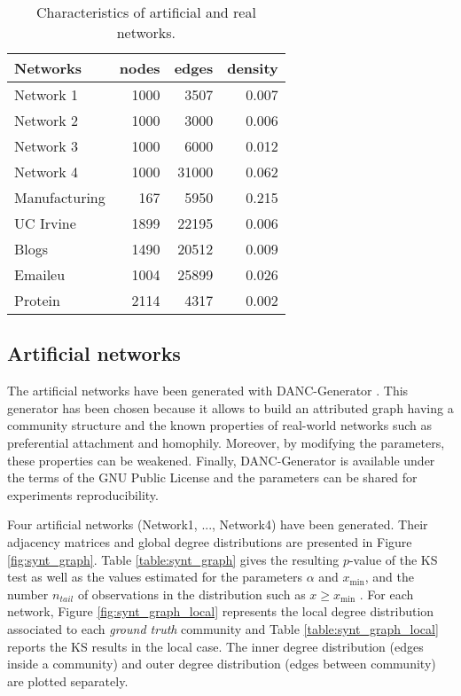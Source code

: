 \documentclass[a4paper, 12pt]{article}
\begin{document}
\begin{table}[h] 
	\centering
	\caption{Characteristics of artificial and real networks.}
    \begin{tabular}{lrrr}
        \hline
        \textbf{Networks} &   nodes &   edges &   density \\
        \hline
        Network 1 &    1000 &    3507 &     0.007 \\
        Network 2 &    1000 &    3000 &     0.006 \\
        Network 3 &    1000 &    6000 &     0.012 \\
        Network 4 &    1000 &   31000 &     0.062 \\
        Manufacturing &     167 &    5950 &     0.215 \\
        UC Irvine     &    1899 &   22195 &     0.006 \\
        Blogs         &    1490 &   20512 &     0.009 \\
        Emaileu       &    1004 &   25899 &     0.026 \\
        Protein       &    2114 &    4317 &     0.002 \\
    \hline
    \end{tabular}
	\label{table:networks_measures}
\end{table}



\subsection{Artificial networks}

The artificial networks have been generated with DANC-Generator \cite{largeron2015}. This generator has been chosen because it allows to build an attributed graph having a community structure  and  the known properties of real-world networks such as preferential attachment and homophily.
Moreover, by modifying the parameters, these properties can be weakened. Finally, DANC-Generator is available under the terms of the GNU Public License and the parameters can be shared for experiments reproducibility.

Four artificial networks (Network1, ..., Network4) have been generated. Their adjacency matrices and global degree distributions are presented in Figure \ref{fig:synt_graph}. Table \ref{table:synt_graph} gives the resulting $p$-value of the KS test as well as the  values estimated for the parameters  $\alpha$ and $x_\text{min}$,  and  the number $n_{tail}$ of observations in the distribution such as $x \geq x_\text{min}$ . For each network, Figure \ref{fig:synt_graph_local} represents the local degree distribution associated to each \emph{ground truth} community and Table \ref{table:synt_graph_local} reports the KS results in the local case. The inner degree distribution (edges inside a community) and outer degree distribution (edges between community) are plotted separately.
\end{document}
